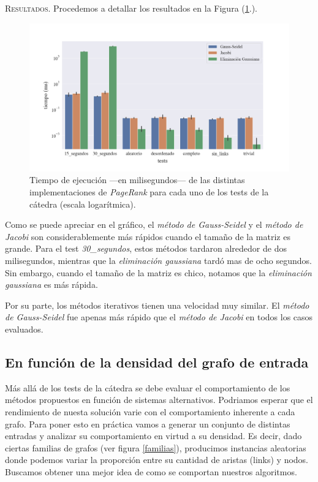 \vspace{2em}
\noindent \textsc{Resultados}. Procedemos a detallar los resultados en la Figura (\ref{tiempo_ej}.). 

\begin{figure}[!htbp]
    \centering
    \includegraphics[width=.9\textwidth, trim=0 0 0 30]{files/src/.media/tiempo-ejecucion.png}
    \caption{Tiempo de ejecución ---en milisegundos--- de las distintas implementaciones de \textit{PageRank} para cada uno de los tests de la cátedra (escala logarítmica).} \label{tiempo_ej}
\end{figure}


\vspace{1em}
Como se puede apreciar en el gráfico, el \textit{método de Gauss-Seidel} y el \textit{método de Jacobi} son considerablemente más rápidos cuando el tamaño de la matriz es grande. Para el test \textit{30\_segundos}, estos métodos tardaron alrededor de dos milisegundos, mientras que la \textit{eliminación gaussiana} tardó mas de ocho segundos. Sin embargo, cuando el tamaño de la matriz es chico, notamos que la \textit{eliminación gaussiana} es más rápida. 

\vspace{1em}
Por su parte, los métodos iterativos tienen una velocidad muy similar. El \textit{método de Gauss-Seidel} fue apenas más rápido que el \textit{método de Jacobi} en todos los casos evaluados.


\vspace{2em}
\subsection{En función de la densidad del grafo de entrada}

Más allá de los tests de la cátedra se debe evaluar el comportamiento de los métodos propuestos en función de sistemas alternativos.
Podriamos esperar que el rendimiento de nuesta solución varie con el comportamiento inherente a cada grafo. 
Para poner esto en práctica vamos a generar un conjunto de distintas entradas y analizar su comportamiento en virtud a su densidad.
Es decir, dado ciertas familias de grafos (ver figura \ref{familias}), producimos instancias aleatorias donde podemos variar la proporción entre su cantidad de aristas (links) y nodos.
Buscamos obtener una mejor idea de como se comportan nuestros algoritmos.

